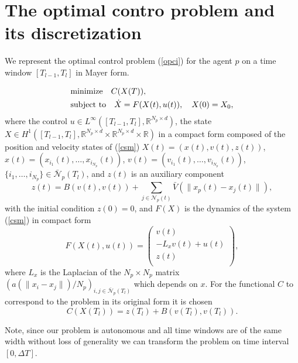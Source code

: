 \documentclass[a4paper,10pt, english]{article}
\newcommand{\D}{\displaystyle}
\begin{document}
 
 \section{The optimal contro problem and its discretization}

 
 We represent the optimal control problem (\ref{opci}) for the agent $p$ on a time window $[T_{l-1}, T_{l}]$ in Mayer form.
  
 \begin{align}
 \D
 & \mbox{minimize}\quad  C(X(T)),   \label{compact_cost} \\ 
 & \mbox{subject to} \quad \dot{X} = F(X(t), u(t)), \quad X(0) = X_0, \label{compact_equation}
 \end{align}
where  the control $u \in  L^{\infty}([T_{l-1}, T_{l}], \mathbb{R}^{N_p \times d})$,
the state $X\in H^1([T_{l-1}, T_{l}], \mathbb{R}^{N_p \times d} \times \mathbb{R}^{N_p\times d} \times \mathbb{R})$
in a compact form composed of the position and velocity 
states of (\ref{csm})   $X(t) = (x(t), v(t), z(t))$, $x(t) = (x_{i_1}(t), \dots, x_{i_{N_p}}(t))$,
 $v(t) = (v_{i_1}(t), \dots, v_{i_{N_p}}(t))$, $\{i_1, \dots, i_{N_p}\} \in \bar{\mathcal{N}}_p(T_l)$, 
 and $z(t)$ is an auxiliary component 
 $$
 z(t) = B(v(t), v(t)) + \sum_{j\in \mathcal{N}_p(t)} \bar{V}(\|x_p(t) - x_j(t)\|),
 $$
 with the initial condition $z(0) = 0$, and $F(X)$ is the dynamics of the system (\ref{csm}) in compact form
 $$
 F(X(t), u(t)) =
  \left( 
  \begin{array}{c}
  v(t)\\
   - L_xv(t) + u(t)\\
   z(t)\\
 \end{array} 
 \right), 
 $$
 where $L_x$ is the Laplacian of the $N_p\times N_p$ matrix $(a(\|x_i - x_j\|)/N_p)_{i, j\in\bar{\mathcal{N}}_p(T_l)}$ which depends on $x$.
 For the functional $C$ to correspond to the problem in its original form it is chosen 
 $$
 C(X(T_l)) = z(T_l) + B(v(T_l), v(T_l)).
 $$
 
  Note, since our problem is autonomous and all time windows are of the same width without loss of generality
 we can transform the problem on time interval $[0, \Delta T]$. 
 
 
  
\end{document}
